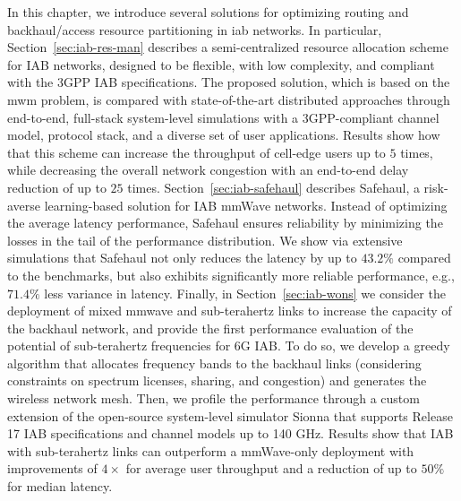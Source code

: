 In this chapter, we introduce several solutions for optimizing routing and backhaul/access resource partitioning in \gls{iab} networks.
In particular, Section~\ref{sec:iab-res-man} describes a semi-centralized resource allocation scheme for IAB networks, designed to be flexible, with low complexity, and compliant with the 3GPP IAB specifications. The proposed solution, which is based on the \gls{mwm} problem, is compared with state-of-the-art distributed approaches through end-to-end, full-stack system-level simulations with a 3GPP-compliant channel model, protocol stack, and a diverse set of user applications. Results show how that this scheme can increase the throughput of cell-edge users up to $5$ times, while decreasing the overall network congestion with an end-to-end delay reduction of up to $25$ times.
Section~\ref{sec:iab-safehaul} describes Safehaul, a risk-averse learning-based solution for IAB mmWave networks. Instead of optimizing the average latency performance, Safehaul ensures reliability by minimizing the losses in the tail of the performance distribution.
We show via extensive simulations that Safehaul not only reduces the latency by up to $43.2\%$ compared to the benchmarks, but also exhibits significantly more reliable performance, e.g., $71.4\%$ less variance in latency.
Finally, in Section~\ref{sec:iab-wons} we consider the deployment of mixed \gls{mmwave} and sub-terahertz links to increase the capacity of the backhaul network, and provide the first performance evaluation of the potential of sub-terahertz frequencies for 6G IAB. 
To do so, we develop a greedy algorithm that allocates frequency bands to the backhaul links (considering constraints on spectrum licenses, sharing, and congestion) and generates the wireless network mesh. Then, we profile the performance through a custom extension of the open-source
system-level simulator Sionna that supports Release 17 IAB specifications and channel models up to 140 GHz. Results
show that IAB with sub-terahertz links can outperform a mmWave-only deployment with improvements of $4\times$ for average
user throughput and a reduction of up to $50\%$ for median latency.


